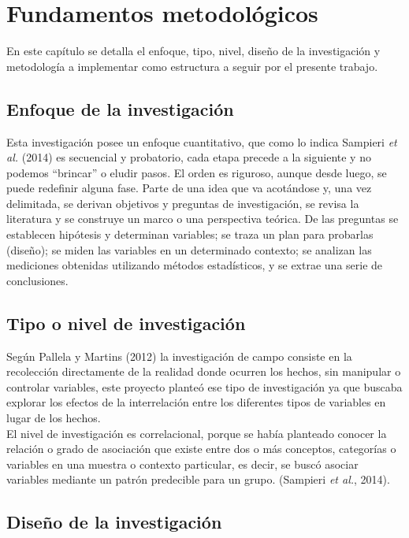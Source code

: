 \chapter{Fundamentos metodológicos}

	En este capítulo se detalla el enfoque, tipo, nivel, diseño de la investigación y metodología a implementar como estructura a seguir por el presente trabajo.

\section{Enfoque de la investigación}

	Esta investigación posee un enfoque cuantitativo, que como lo indica Sampieri \textit{et al.} (2014) es secuencial y
	probatorio, cada etapa precede a la siguiente y no podemos “brincar” o eludir pasos. El orden es riguroso,
	aunque desde luego, se puede redefinir alguna fase. Parte de una idea que va acotándose y, una vez delimitada,
	se derivan objetivos y preguntas de investigación, se revisa la literatura y se construye un marco o una perspectiva
	teórica. De las preguntas se establecen hipótesis y determinan variables; se traza un plan para probarlas (diseño);
	se miden las variables en un determinado contexto; se analizan las mediciones obtenidas utilizando métodos estadísticos,
	y se extrae una serie de conclusiones.\\


\section{Tipo o nivel de investigaci\'on}

Según Pallela y Martins (2012) la investigación de campo consiste en la recolección directamente de la realidad donde ocurren los hechos, sin manipular o controlar variables, este proyecto planteó ese tipo de investigación ya que buscaba explorar los efectos de la interrelación entre los diferentes tipos de variables en lugar de los hechos.\\

El nivel de investigación es correlacional, porque se había planteado conocer la relación o grado de asociación que existe entre dos o más conceptos, categorías o variables en una muestra o contexto particular, es decir, se buscó asociar variables mediante un patrón predecible para un grupo. (Sampieri \textit{et al.}, 2014).


\section{Dise\~no de la investigaci\'on}

